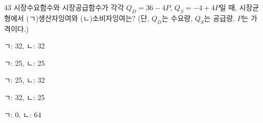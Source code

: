 \begin{question}{43}
시장수요함수와 시장공급함수가 각각 $Q_D = 36 - 4P$, $Q_S = -4 + 4P$일 때, 시장균형에서 (ㄱ)생산자잉여와 (ㄴ)소비자잉여는? (단, $Q_D$는 수요량, $Q_S$는 공급량, $P$는 가격이다.)
\begin{choices}
  \item ㄱ: 32, ㄴ: 32
  \item ㄱ: 25, ㄴ: 25
  \item ㄱ: 25, ㄴ: 32
  \item ㄱ: 32, ㄴ: 25
  \item ㄱ: 0, ㄴ: 64
\end{choices}
\end{question}
